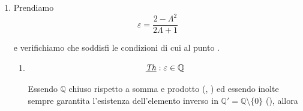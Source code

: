 \begin{enumerate}
\begin{demonstration}
\begin{enumerate}[label=(\roman*)]
\begin{enumerate}[label=\arabic*.]
                \item Prendiamo
                \[ \varepsilon = \frac{2-\Lambda^2}{2\Lambda+1} \]

                e verifichiamo che soddisfi le condizioni di cui al punto  .

                \begin{enumerate}[label=\arabic{enumiii}.\arabic*.]
                    \item
                    
                    \[ \underbar{\textit{Th}}: \varepsilon\in\mathbb{Q}\]

                    Essendo $\mathbb{Q}$ chiuso rispetto a somma e prodotto (,
                    ) ed essendo inolte sempre garantita l'esistenza dell'elemento inverso
                    in $\mathbb{Q}' = \mathbb{Q} \setminus \{0\}$ (), allora


\end{enumerate}
\end{enumerate}
\end{enumerate}
\end{demonstration}
\end{enumerate}
